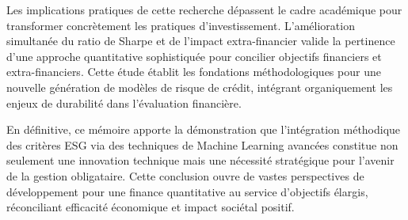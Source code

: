 Les implications pratiques de cette recherche dépassent le cadre académique pour transformer concrètement les pratiques d'investissement. L'amélioration simultanée du ratio de Sharpe et de l'impact extra-financier valide la pertinence d'une approche quantitative sophistiquée pour concilier objectifs financiers et extra-financiers. Cette étude établit les fondations méthodologiques pour une nouvelle génération de modèles de risque de crédit, intégrant organiquement les enjeux de durabilité dans l'évaluation financière.

En définitive, ce mémoire apporte la démonstration que l'intégration méthodique des critères ESG via des techniques de Machine Learning avancées constitue non seulement une innovation technique mais une nécessité stratégique pour l'avenir de la gestion obligataire. Cette conclusion ouvre de vastes perspectives de développement pour une finance quantitative au service d'objectifs élargis, réconciliant efficacité économique et impact sociétal positif.
